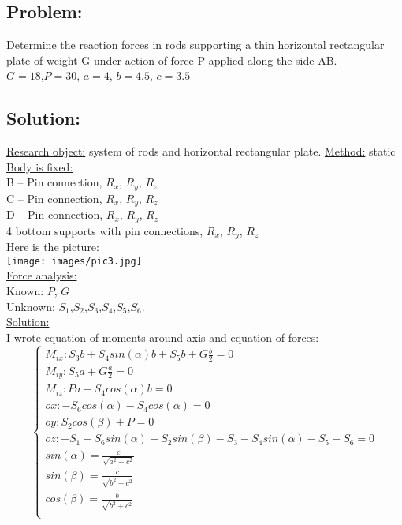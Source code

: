 \documentclass[a4paper,11pt,oneside,article]{memoir}
\begin{document}
\subsection{Problem:}
Determine the reaction forces in rods supporting a  thin horizontal rectangular plate of weight G under action of force P applied along the side AB.\\
$G = 18$,$P=30$, $a=4$, $b=4.5$, $c=3.5$
\subsection{Solution:}
\underline{Research object:} system of rods and horizontal rectangular plate.
\underline{Method:} static\\
\underline{Body is fixed:}\\
B – Pin connection, $R_x$, $R_y$, $R_z$\\
C – Pin connection, $R_x$, $R_y$, $R_z$\\
D – Pin connection, $R_x$, $R_y$, $R_z$\\
4 bottom supports with pin connections, $R_x$, $R_y$, $R_z$\\
Here is the picture:\\
\texttt{[image: images/pic3.jpg]}\\
\underline{Force analysis:}\\
Known: $P$, $G$\\
Unknown: $S_1$,$S_2$,$S_3$,$S_4$,$S_5$,$S_6$.\\
\underline{Solution:}\\
I wrote equation of moments around axis and equation of forces:
\begin{equation}
    \begin{cases}
    M_{ix}:  S_3 b + S_4 sin(\alpha) b + S_5 b + G \frac{b}{2} = 0\\
    M_{iy}: S_5 a + G\frac{a}{2}= 0 \\
    M_{iz}: P a - S_4cos(\alpha) b = 0\\
    ox: -S_6 cos(\alpha) - S_4 cos(\alpha) = 0\\
    oy: S_2 cos(\beta) + P = 0\\
    oz: -S_1 - S_6 sin(\alpha) - S_2 sin(\beta) - S_3 - S_4 sin(\alpha) - S_5- S_6 = 0\\
    sin(\alpha) = \frac{c}{\sqrt{a^2+c^2}}\\
    sin(\beta) = \frac{c}{\sqrt{b^2+c^2}}\\
    cos(\beta) = \frac{b}{\sqrt{b^2+c^2}}\\
    \end{cases}
\end{equation}
\end{document}
